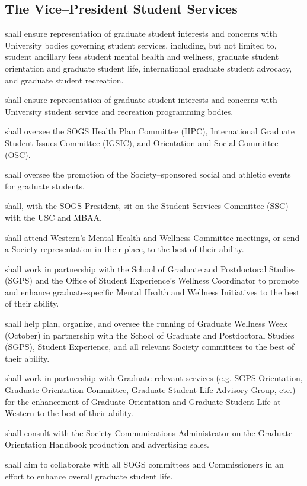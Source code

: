 \subsection {The Vice--President Student Services} 
\begin{longenum}[ label*=\thesubsection.\arabic*., align=left]
	\item shall ensure representation of graduate student interests and concerns with
	University bodies governing student services, including, but not limited to, student ancillary fees student mental health and wellness, graduate student orientation and graduate student life, international graduate student advocacy, and graduate student recreation.
    \item shall ensure representation of graduate student interests and concerns with University student service and recreation programming bodies.
    \item shall oversee the SOGS Health Plan Committee (HPC), International Graduate Student Issues Committee (IGSIC), and Orientation and Social Committee (OSC).
    \item shall oversee the promotion of the Society--sponsored social and athletic events for graduate students.
    \item shall, with the SOGS President, sit on the Student Services Committee (SSC) with the USC and MBAA.
    \item shall attend Western's Mental Health and Wellness Committee meetings, or send a Society
representation in their place, to the best of their ability.
\item shall work in partnership with the School of Graduate and Postdoctoral Studies (SGPS) and the Office of Student Experience's Wellness Coordinator to promote
and enhance graduate-specific Mental Health and Wellness Initiatives to the best of their
ability.
\item shall help plan, organize, and oversee the running of Graduate Wellness Week
(October) in partnership with the School of Graduate and Postdoctoral Studies (SGPS), Student Experience, and all relevant Society
committees to the best of their ability.
\item shall work in partnership with Graduate-relevant services (e.g. SGPS Orientation,
Graduate Orientation Committee, Graduate Student Life Advisory Group, etc.) for the
enhancement of Graduate Orientation and Graduate Student Life at Western to the
best of their ability.
\item shall consult with the Society Communications Administrator on the Graduate
Orientation Handbook production and advertising sales.
\item shall aim to collaborate with all SOGS committees and Commissioners in an effort to enhance overall graduate student life.
    
\end{longenum}

